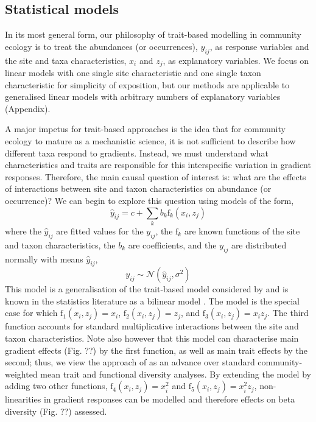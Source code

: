 \documentclass[12pt]{ecology}
\begin{document}

\subsection{Statistical models}

In its most general form, our philosophy of trait-based modelling in community ecology is to treat the abundances (or occurrences), $y_{ij}$, as response variables and the site and taxa characteristics, $x_i$ and $z_j$, as explanatory variables.  We focus on linear models with one single site characteristic and one single taxon characteristic for simplicity of exposition, but our methods are applicable to generalised linear models with arbitrary numbers of explanatory variables (Appendix).

A major impetus for trait-based approaches is the idea that for community ecology to mature as a mechanistic science, it is not sufficient to describe how different taxa respond to gradients.  Instead, we must understand what characteristics and traits are responsible for this interspecific variation in gradient responses.  Therefore, the main causal question of interest is:  what are the effects of interactions between site and taxon characteristics on abundance (or occurrence)?  We can begin to explore this question using models of the form,
\begin{equation}
\hat{y}_{ij} = c + 
	\sum_k b_k \mathrm{f}_k (x_i, z_j)
\end{equation}
where the $\hat{y}_{ij}$ are fitted values for the $y_{ij}$, the $\mathrm{f}_k$ are known functions of the site and taxon characteristics, the $b_k$ are coefficients, and the $y_{ij}$ are distributed normally with means $\hat{y}_{ij}$,
\begin{equation}
y_{ij} \sim \mathcal{N}(\hat{y}_{ij},\sigma^2)
\end{equation}
This model is a generalisation of the trait-based model considered by \citet{CormontEtAl2011} and is known in the statistics literature as a bilinear model \citep{Gabriel1998}.  The \citet{CormontEtAl2011} model is the special case for which $\mathrm{f}_1(x_i, z_j) = x_i$, $\mathrm{f}_2(x_i, z_j) = z_j$, and $\mathrm{f}_3(x_i, z_j) = x_i z_j$.  The third function accounts for standard multiplicative interactions between the site and taxon characteristics.  Note also however that this model can characterise main gradient effects (Fig. ??) by the first function, as well as main trait effects by the second; thus, we view the approach of \citet{CormontEtAl2011} as an advance over standard community-weighted mean trait and functional diversity analyses.  By extending the model by adding two other functions, $\mathrm{f}_4(x_i, z_j) = x_i^2$ and $\mathrm{f}_5(x_i, z_j) = x_i^2 z_j$, non-linearities in gradient responses can be modelled and therefore effects on beta diversity (Fig. ??) assessed.
\end{document}
